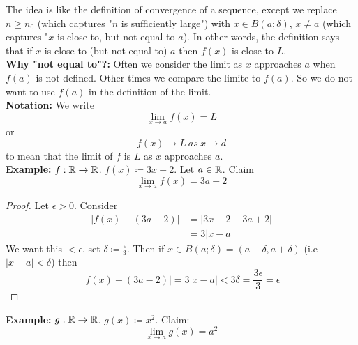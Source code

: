 \documentclass[openany]{report}
\begin{document}
The idea is like the definition of convergence of a sequence, except we replace $n \geq n_0$
(which captures "$n$ is sufficiently large") with $x \in B(a;\delta)$, $x \neq a$ (which captures
"$x$ is close to, but not equal to $a$). In other words, the definition says
that if $x$ is close to (but not equal to) $a$
 then $f(x)$ is close to $L$.\\[2ex]

 \textbf{Why "not equal to"?:} Often we consider the limit as $x$ approaches
 $a$ when $f(a)$ is not defined. Other times we compare the limite to $f(a)$.
 So we do not want to use $f(a)$ in the definition of the limit. \\[2ex]

 \textbf{Notation:} We write 
 $$\lim_{x \rightarrow a} f(x) = L$$
 or 
 $$f(x) \rightarrow L \ as \ x \rightarrow d$$
 to mean that the limit of $f$ is $L$ as $x$ approaches $a$.\\[2ex]
 \textbf{Example:} $f: \mathbb{R} \rightarrow \mathbb{R}$. $f(x) \coloneqq 3x - 2$. 
 Let $a \in \mathbb{R}$. Claim
 $$\lim_{x\rightarrow a} f(x) = 3a - 2$$
 \begin{proof}
    Let $\epsilon > 0$. Consider 
    \begin{align*}
        |f(x) - (3a-2)| &= |3x-2 - 3a + 2|\\
        &= 3|x-a|
    \end{align*}
    We want this $< \epsilon$, set $\delta \coloneqq \frac{\epsilon}{3}$. Then if
    $x \in B(a; \delta) = (a - \delta, a + \delta)$ (i.e $|x-a| < \delta$)
    then 
    $$|f(x) - (3a - 2)| = 3|x-a| < 3 \delta = \frac{3\epsilon}{3} = \epsilon$$
 \end{proof}
\textbf{Example:} $g: \mathbb{R} \rightarrow \mathbb{R}$. $g(x) \coloneqq x^2$. Claim: 
$$\lim_{x\rightarrow a} g(x) = a^2$$
\end{document}
